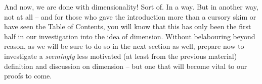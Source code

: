 And now, we are done with dimensionality! Sort of. In a way. But in another way, not at all -- and for those who gave the introduction more than a cursory skim or have seen the Table of Contents, you will know that this has only been the first half in our investigation into the idea of dimension. Without belabouring beyond reason, as we will be sure to do so in the next section as well, prepare now to investigate a \emph{seemingly} less motivated (at least from the previous material) definition and discussion on dimension -- but one that will become vital to our proofs to come.
